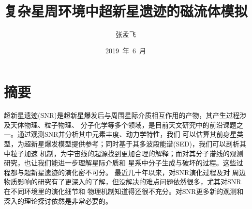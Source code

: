 \confidential{}%
\title{复杂星周环境中超新星遗迹的磁流体模拟}%
\author{张孟飞}%
\date{2019~年~6~月}%
\maketitle%
\MAKETITLE%
\makedeclaration%
\chapter*{摘\quad 要}%
\setcounter{page}{1}%

超新星遗迹(SNR)是超新星爆发后与周围星际介质相互作用的产物，其产生过程涉及天体物理、粒子物理、
分子化学等多个领域，是目前天文研究中的前沿课题之一。通过观测SNR并分析其中元素丰度、动力学特性，我们
可以估算其前身星类型，为超新星爆发模型提供参考；同时基于其多波段能谱(SED)，我们可以剖析其中粒子加速
机制，为宇宙线的起源找到更加合理的解释；而对其分子谱线的观测研究，也让我们能进一步理解星际介质和
星系中分子生成与破坏的过程。这些过程都与超新星遗迹的演化密不可分。 最近几十年以来，对SNR演化过程及对
周边物质影响的研究有了更深入的了解，但没解决的难点问题依然很多，尤其对SNR在不同环境里的演化细节和
物理机制知道得还很不充分。对SNR更多新的观测和深入的理论探讨依然是非常必要的。

